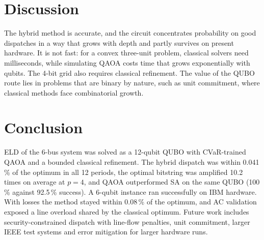\documentclass[conference]{IEEEtran}
\begin{document}
\section{Discussion}
The hybrid method is accurate, and the circuit concentrates probability on good dispatches in a way that grows with depth and partly survives on present hardware. It is not fast: for a convex three-unit problem, classical solvers need milliseconds, while simulating QAOA costs time that grows exponentially with qubits. The 4-bit grid also requires classical refinement. The value of the QUBO route lies in problems that are binary by nature, such as unit commitment, where classical methods face combinatorial growth.

\section{Conclusion}
ELD of the 6-bus system was solved as a 12-qubit QUBO with CVaR-trained QAOA and a bounded classical refinement. The hybrid dispatch was within 0.041\,\% of the optimum in all 12 periods, the optimal bitstring was amplified 10.2 times on average at $p = 4$, and QAOA outperformed SA on the same QUBO (100\,\% against 92.5\,\% success). A 6-qubit instance ran successfully on IBM hardware. With losses the method stayed within 0.08\,\% of the optimum, and AC validation exposed a line overload shared by the classical optimum. Future work includes security-constrained dispatch with line-flow penalties, unit commitment, larger IEEE test systems and error mitigation for larger hardware runs.
\end{document}
